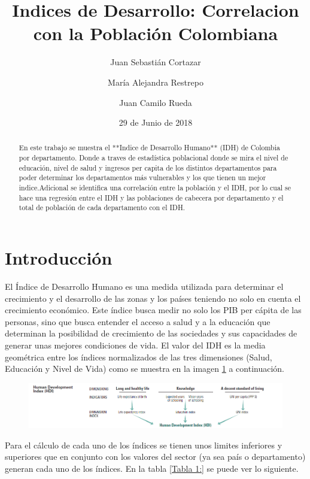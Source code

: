 \documentclass{article}
\title{Indices de Desarrollo: Correlacion con la Población Colombiana}
\author[1]{\normalsize Juan Sebastián Cortazar}
\author[2]{\normalsize María Alejandra Restrepo}
\author[3]{\normalsize Juan Camilo Rueda}
\affil[1,2,3]{\small  Universidad de los Andes\\
\texttt{{js.cortazar533,ma.restrepot,jc.rueda169}@uniandes.edu.col}}
\date{29 de Junio de 2018}
\begin{document}


\maketitle


\begin{abstract}
En este trabajo se muestra el **Indice de Desarrollo Humano** (IDH) de Colombia por departamento. Donde a traves de estadística poblacional donde se mira el nivel de educación, nivel de salud y ingresos per capita de los distintos departamentos para poder determinar los departamentos más vulnerables y los que tienen un mejor indice.Adicional se identifica una correlación entre la población y el IDH, por lo cual se hace una regresión entre el IDH y las poblaciones de cabecera por departamento y el total de población de cada departamento con el IDH. 
\end{abstract}

\section*{Introducción}

El Índice de Desarrollo Humano es una medida utilizada para determinar el crecimiento y el desarrollo de las zonas y los países teniendo no solo en cuenta el crecimiento económico. Este índice busca medir no solo los PIB per cápita de las personas, sino que busca entender el acceso a salud y a la educación que determinan la posibilidad de crecimiento de las sociedades y sus capacidades de generar unas mejores condiciones de vida. 
El valor del IDH es la media geométrica entre los índices normalizados de las tres dimensiones (Salud, Educación y Nivel de Vida) como se muestra en la imagen \ref{IDH} a continuación. 


\begin{figure}[h]
\centering
\includegraphics{hdiCalc}
\label {IDH}
\end{figure}

Para el cálculo de cada uno de los índices se tienen unos limites inferiores y superiores que en conjunto con los valores del sector (ya sea país o departamento) generan cada uno de los índices. En la tabla \ref{Tabla 1:} se puede ver lo siguiente.
\end{document}
